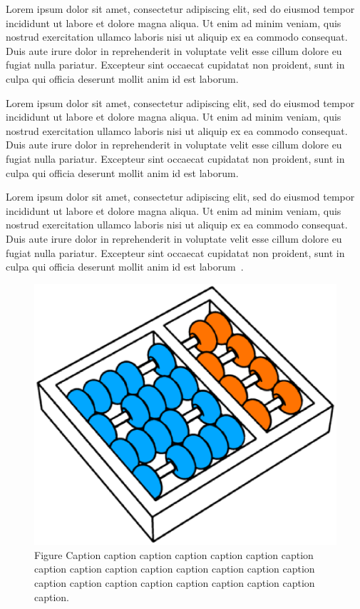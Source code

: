 \documentclass[Portugues]{ic-tese-v3}
\begin{document}
Lorem ipsum dolor sit amet, consectetur adipiscing elit, sed do eiusmod
tempor incididunt ut labore et dolore magna aliqua. Ut enim ad minim
veniam, quis nostrud exercitation ullamco laboris nisi ut aliquip ex ea
commodo consequat. Duis aute irure dolor in reprehenderit in voluptate
velit esse cillum dolore eu fugiat nulla pariatur. Excepteur sint occaecat
cupidatat non proident, sunt in culpa qui officia deserunt mollit anim id
est laborum.

Lorem ipsum dolor sit amet, consectetur adipiscing elit, sed do eiusmod
tempor incididunt ut labore et dolore magna aliqua. Ut enim ad minim
veniam, quis nostrud exercitation ullamco laboris nisi ut aliquip ex ea
commodo consequat. Duis aute irure dolor in reprehenderit in voluptate
velit esse cillum dolore eu fugiat nulla pariatur. Excepteur sint occaecat
cupidatat non proident, sunt in culpa qui officia deserunt mollit anim id
est laborum.

Lorem ipsum dolor sit amet, consectetur adipiscing elit, sed do eiusmod
tempor incididunt ut labore et dolore magna aliqua. Ut enim ad minim
veniam, quis nostrud exercitation ullamco laboris nisi ut aliquip ex ea
commodo consequat. Duis aute irure dolor in reprehenderit in voluptate
velit esse cillum dolore eu fugiat nulla pariatur. Excepteur sint occaecat
cupidatat non proident, sunt in culpa qui officia deserunt mollit anim id
est laborum~\cite{2014-bic,2015-ela}.


\begin{figure}
\centerline{\includegraphics[scale=0.2]{logo-ic-unicamp.eps}}
\caption[Shorter figure caption]{Figure Caption caption caption caption
  caption caption caption caption caption caption caption caption caption
  caption caption caption caption caption caption caption caption caption
  caption caption.}
\label{f:smiles}
\end{figure}
\end{document}
